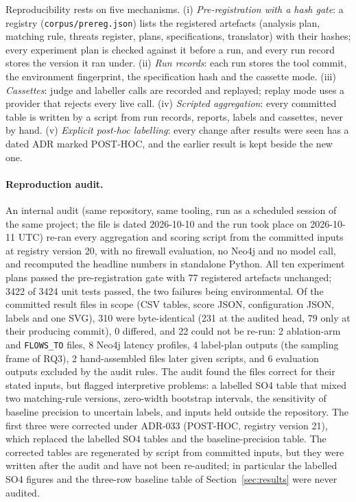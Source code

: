 \documentclass[10pt,a4paper]{article}
\newcommand{\edge}[1]{\texttt{\small #1}}
\begin{document}
Reproducibility rests on five mechanisms.
(i) \emph{Pre-registration with a hash gate}: a registry (\texttt{corpus/prereg.json}) lists the registered
artefacts (analysis plan, matching rule, threats register, plans, specifications, translator) with their hashes; every
experiment plan is checked against it before a run, and every run record stores the version it ran under.
(ii) \emph{Run records}: each run stores the tool commit, the environment fingerprint, the specification hash and the
cassette mode.
(iii) \emph{Cassettes}: judge and labeller calls are recorded and replayed; replay mode uses a provider that rejects
every live call.
(iv) \emph{Scripted aggregation}: every committed table is written by a script from run records, reports, labels and
cassettes, never by hand.
(v) \emph{Explicit post-hoc labelling}: every change after results were seen has a dated ADR marked POST-HOC, and
the earlier result is kept beside the new one.

\paragraph{Reproduction audit.}
An internal audit (same repository, same tooling, run as a scheduled session of the same project; the file is
dated 2026-10-10 and the run took place on 2026-10-11 UTC) re-ran every aggregation and scoring script from the
committed inputs at registry version 20, with no firewall evaluation, no Neo4j and no model call, and recomputed the
headline numbers in standalone Python. %
All ten experiment plans passed the pre-registration gate with 77 registered artefacts unchanged; 3422 of 3424 unit
tests passed, the two failures being environmental. Of the committed result files in scope (CSV tables, score
JSON, configuration JSON, labels and one SVG), 310 were byte-identical (231 at the audited head, 79 only at their
producing commit), 0 differed, and 22 could not be re-run: 2 ablation-arm and \edge{FLOWS\_TO} files, 8 Neo4j
latency profiles, 4 label-plan outputs (the sampling frame of RQ3), 2 hand-assembled files later given scripts, and
6 evaluation outputs excluded by the audit rules. %
The audit found the files correct for their stated inputs, but flagged interpretive problems: a labelled SO4 table
that mixed two matching-rule versions, zero-width bootstrap intervals, the sensitivity of baseline precision to
uncertain labels, and inputs held outside the repository. The first three were corrected under ADR-033 (POST-HOC,
registry version 21), which replaced the labelled SO4 tables and the baseline-precision table. The corrected tables
are regenerated by script from committed inputs, but they were written after the audit and have not been re-audited;
in particular the labelled SO4 figures and the three-row baseline table of Section~\ref{sec:results} were never
audited. %
\end{document}

